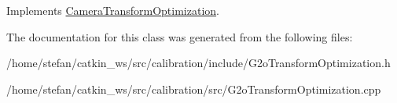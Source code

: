 \-Implements \hyperlink{classCameraTransformOptimization_a8a4a4a09325f4bae401bad62ec7e9f02}{\-Camera\-Transform\-Optimization}.



\-The documentation for this class was generated from the following files\-:\begin{DoxyCompactItemize}
\item 
/home/stefan/catkin\-\_\-ws/src/calibration/include/\-G2o\-Transform\-Optimization.\-h\item 
/home/stefan/catkin\-\_\-ws/src/calibration/src/\-G2o\-Transform\-Optimization.\-cpp\end{DoxyCompactItemize}
